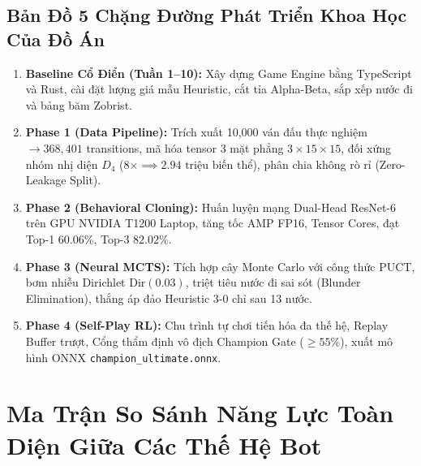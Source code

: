 \documentclass[12pt,a4paper,oneside]{report}
\begin{document}
\section{Bản Đồ 5 Chặng Đường Phát Triển Khoa Học Của Đồ Án}

\begin{enumerate}
    \item \textbf{Baseline Cổ Điển (Tuần 1--10):} Xây dựng Game Engine bằng TypeScript và Rust, cài đặt lượng giá mẫu Heuristic, cắt tỉa Alpha-Beta, sắp xếp nước đi và bảng băm Zobrist.
    \item \textbf{Phase 1 (Data Pipeline):} Trích xuất 10,000 ván đấu thực nghiệm $\to 368,401$ transitions, mã hóa tensor 3 mặt phẳng $3 \times 15 \times 15$, đối xứng nhóm nhị diện $D_4$ ($8\times \implies 2.94\text{ triệu biến thể}$), phân chia không rò rỉ (Zero-Leakage Split).
    \item \textbf{Phase 2 (Behavioral Cloning):} Huấn luyện mạng Dual-Head ResNet-6 trên GPU NVIDIA T1200 Laptop, tăng tốc AMP FP16, Tensor Cores, đạt Top-1 $60.06\%$, Top-3 $82.02\%$.
    \item \textbf{Phase 3 (Neural MCTS):} Tích hợp cây Monte Carlo với công thức PUCT, bơm nhiễu Dirichlet $\text{Dir}(0.03)$, triệt tiêu nước đi sai sót (Blunder Elimination), thắng áp đảo Heuristic 3-0 chỉ sau 13 nước.
    \item \textbf{Phase 4 (Self-Play RL):} Chu trình tự chơi tiến hóa đa thế hệ, Replay Buffer trượt, Cổng thẩm định vô địch Champion Gate ($\ge 55\%$), xuất mô hình ONNX \texttt{champion\_ultimate.onnx}.
\end{enumerate}

\chapter{Ma Trận So Sánh Năng Lực Toàn Diện Giữa Các Thế Hệ Bot}
\end{document}
